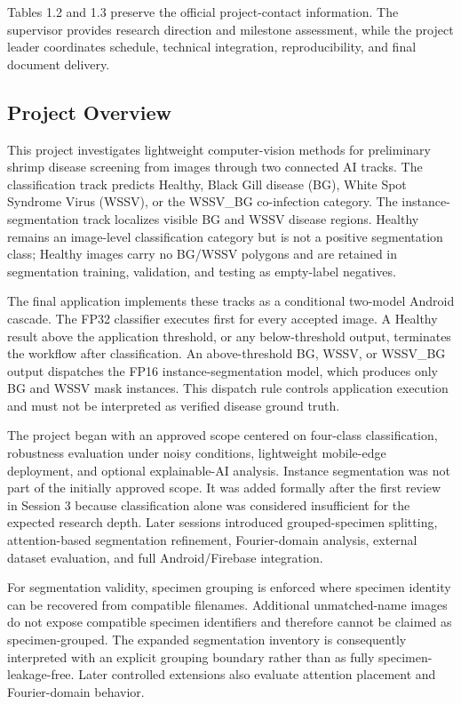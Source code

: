 \documentclass[12pt,a4paper]{report}
\newenvironment{revisionblock}{\begin{snugshade}\noindent}{\end{snugshade}}
\begin{document}
\endgroup
Tables 1.2 and 1.3 preserve the official project-contact information. The supervisor provides research direction and milestone assessment, while the project leader coordinates schedule, technical integration, reproducibility, and final document delivery.\par
\subsection{\texorpdfstring{\colorbox{RevisionYellow}{Project Overview}}{Project Overview}}
\begin{revisionblock}
This project investigates lightweight computer-vision methods for preliminary shrimp disease screening from images through two connected AI tracks. The classification track predicts Healthy, Black Gill disease (BG), White Spot Syndrome Virus (WSSV), or the WSSV\_BG co-infection category. The instance-segmentation track localizes visible BG and WSSV disease regions. Healthy remains an image-level classification category but is not a positive segmentation class; Healthy images carry no BG/WSSV polygons and are retained in segmentation training, validation, and testing as empty-label negatives.
\end{revisionblock}
\begin{revisionblock}
The final application implements these tracks as a conditional two-model Android cascade. The FP32 classifier executes first for every accepted image. A Healthy result above the application threshold, or any below-threshold output, terminates the workflow after classification. An above-threshold BG, WSSV, or WSSV\_BG output dispatches the FP16 instance-segmentation model, which produces only BG and WSSV mask instances. This dispatch rule controls application execution and must not be interpreted as verified disease ground truth.
\end{revisionblock}
The project began with an approved scope centered on four-class classification, robustness evaluation under noisy conditions, lightweight mobile-edge deployment, and optional explainable-AI analysis. Instance segmentation was not part of the initially approved scope. It was added formally after the first review in Session 3 because classification alone was considered insufficient for the expected research depth. Later sessions introduced grouped-specimen splitting, attention-based segmentation refinement, Fourier-domain analysis, external dataset evaluation, and full Android/Firebase integration.\par
\begin{revisionblock}
For segmentation validity, specimen grouping is enforced where specimen identity can be recovered from compatible filenames. Additional unmatched-name images do not expose compatible specimen identifiers and therefore cannot be claimed as specimen-grouped. The expanded segmentation inventory is consequently interpreted with an explicit grouping boundary rather than as fully specimen-leakage-free. Later controlled extensions also evaluate attention placement and Fourier-domain behavior.
\end{revisionblock}
\end{document}
